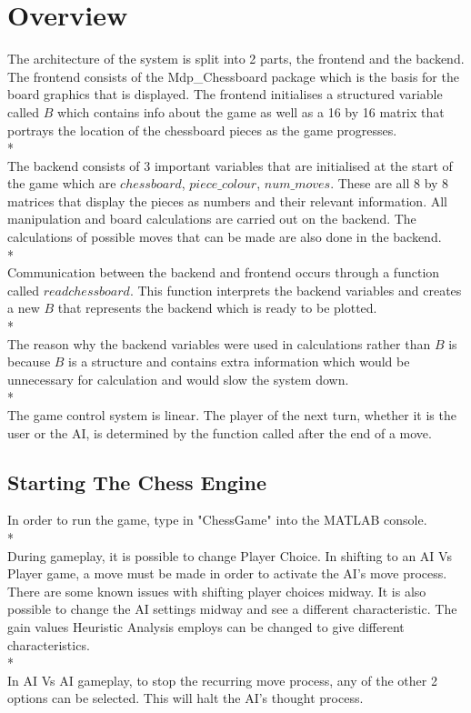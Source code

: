 \documentclass[11pt,a4paper]{article}
\begin{document}
\newpage
\section{Overview}
\indent\indent The architecture of the system is split into 2 parts, the frontend and the backend. The frontend consists of the Mdp\_Chessboard package which is the basis for the board graphics that is displayed. The frontend initialises a structured variable called $B$ which contains info about the game as well as a 16 by 16 matrix that portrays the location of the chessboard pieces as the game progresses. 
\\*\\
\indent The backend consists of 3 important variables that are initialised at the start of the game which are $chessboard$, $piece\_colour$, $num\_moves$. These are all 8 by 8 matrices that display the pieces as numbers and their relevant information. All manipulation and board calculations are carried out on the backend. The calculations of possible moves that can be made are also done in the backend.
\\*\\
\indent Communication between the backend and frontend occurs through a function called $readchessboard$. This function interprets the backend variables and creates a new $B$ that represents the backend which is ready to be plotted.
\\*\\
\indent The reason why the backend variables were used in calculations rather than $B$ is because $B$ is a structure and contains extra information which would be unnecessary for calculation and would slow the system down.
\\*\\
\indent The game control system is linear. The player of the next turn, whether it is the user or the AI, is determined by the function called after the end of a move.
\subsection{Starting The Chess Engine}
\indent \indent In order to run the game, type in "ChessGame" into the MATLAB console.
\\*\\
\indent During gameplay, it is possible to change Player Choice. In shifting to an AI Vs Player game, a move must be made in order to activate the AI's move process. There are some known issues with shifting player choices midway. It is also possible to change the AI settings midway and see a different characteristic. The gain values Heuristic Analysis employs can be changed to give different characteristics.
\\*\\
\indent In AI Vs AI gameplay, to stop the recurring move process, any of the other 2 options can be selected. This will halt the AI's thought process.
\newpage
\end{document}
